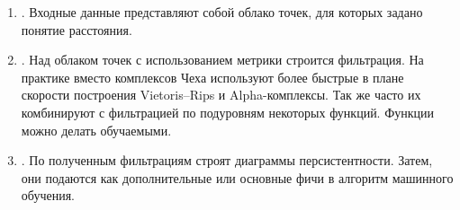\begin{enumerate}
\item. Входные данные представляют собой облако точек, для которых задано понятие расстояния.
\item. Над облаком точек с использованием метрики строится фильтрация. На практике вместо комплексов Чеха используют более быстрые в плане скорости построения Vietoris–Rips и Alpha-комплексы. Так же часто их комбинируют с фильтрацией по подуровням некоторых функций. Функции можно делать обучаемыми.
\item. По полученным фильтрациям строят диаграммы персистентности. Затем, они подаются как дополнительные или основные фичи в алгоритм машинного обучения.
\end{enumerate}